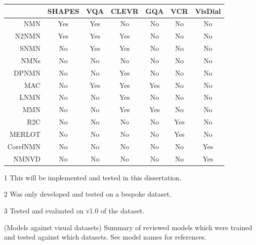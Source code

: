 \begin{table}[]
\begin{threeparttable}
    \small
    \begin{tabular}{@{}rcccccc@{}}
        \toprule
                    & SHAPES & VQA          & CLEVR & GQA & VCR & VisDial \\ \midrule
        NMN\cite{andreas_neural_2016}               & Yes    & Yes          & No    & No  & No  & No      \\
        N2NMN\cite{hu_learning_2017}                & Yes    & Yes          & Yes   & No  & No  & No      \\
        SNMN\cite{hu_explainable_2019}              & No     & Yes          & Yes   & No  & No\tnote{1} & No      \\
        NMNs\pm{}\cite{chen_teaching_2022}\tnote{2} & No     & No           & No    & No  & No  & No      \\
        DPNMN\cite{su_toward_2020}                  & No     & No           & Yes   & No  & No  & No      \\
        MAC\cite{hudson_compositional_2018}         & No     & Yes\tnote{3} & Yes   & Yes & No  & No      \\
        LNMN\cite{pahuja_learning_2019}             & No     & No           & Yes   & No  & No  & No      \\
        MMN\cite{chen_meta_2020}                    & No     & No           & Yes   & Yes & No  & No      \\
        R2C\cite{zellers_recognition_2019}          & No     & No           & No    & No  & Yes & No      \\
        MERLOT\cite{zellers_merlot_2022}            & No     & No           & No    & No  & Yes & No      \\
        CorefNMN\cite{kottur_visual_2018}           & No     & No           & No    & No  & No  & Yes     \\
        NMNVD\cite{cho_visual_2021}                 & No     & No           & No    & No  & No  & Yes     \\ \bottomrule
    \end{tabular}
    \begin{tablenotes}
        \item[1] This will be implemented and tested in this dissertation.
        \item[2] Was only developed and tested on a bespoke dataset\cite{chen_teaching_2022}.
        \item[3] Tested and evaluated on v1.0 of the dataset\cite{hudson_compositional_2018}.
    \end{tablenotes}
\end{threeparttable}
\captionsource(Models against visual datasets)
    {Summary of reviewed models which were trained and tested against which datasets.\label{tab:models_against_datasets}}
    {See model names for references.}
\end{table}

